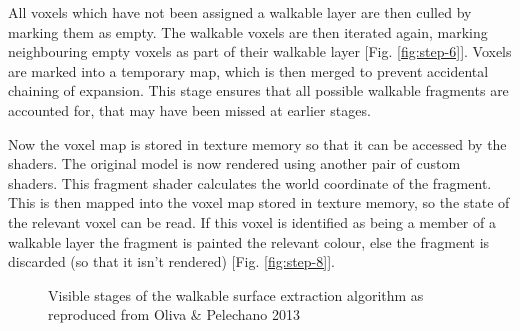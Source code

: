       All voxels which have not been assigned a walkable layer are then culled by marking them as empty. The walkable voxels are then iterated again, marking neighbouring empty voxels as part of their walkable layer [Fig. \ref{fig:step-6}]. Voxels are marked into a temporary map, which is then merged to prevent accidental chaining of expansion. This stage ensures that all possible walkable fragments are accounted for, that may have been missed at earlier stages.
      
      Now the voxel map is stored in texture memory so that it can be accessed by the shaders. The original model is now rendered using another pair of custom shaders. This fragment shader calculates the world coordinate of the fragment. This is then mapped into the voxel map stored in texture memory, so the state of the relevant voxel can be read. If this voxel is identified as being a member of a walkable layer the fragment is painted the relevant colour, else the fragment is discarded (so that it isn't rendered) [Fig. \ref{fig:step-8}].
    \begin{figure}
\protect\caption{Visible stages of the walkable surface extraction algorithm as reproduced from Oliva \& Pelechano 2013 \cite{OP13}}

\begin{centering}
\par\end{centering}

\begin{centering}
\par\end{centering}

\centering{}
\end{figure}


